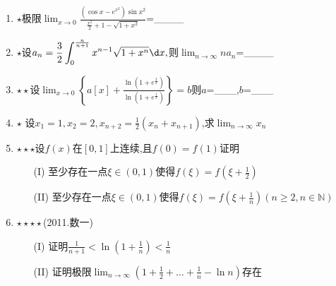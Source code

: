 \documentclass[12pt, a4paper, oneside, UTF8]{ctexbook}
\begin{document}
\begin{enumerate}
    \item $\star$极限$\displaystyle \lim_{x\to 0}\frac{(\cos{x}-e^{x^2})\sin x^2}{\frac{x^2}{2}+1-\sqrt{1+x^2}}$=\_\_\_\_ 
    
    \item $\star$设$\displaystyle a_n=\frac{3}{2}\int_{0}^{\frac{n}{n+1}}x^{n-1}\sqrt{1+x^n}\d x,$则$\displaystyle \lim_{n\to\infty}na_n$=\_\_\_\_
    
    \item $\star\star$设$\displaystyle \lim_{x\to 0}\left\{a\left[x\right]+\frac{\ln\left(1+e^{\frac{2}{x}}\right)}{\ln\left(1+e^{\frac{1}{x}}\right)}\right\}=b$则$a$=\_\_\_,$b$=\_\_\_

    \item $\star$ 设$x_1=1,x_2=2,x_{n+2}=\displaystyle \frac{1}{2}(x_n+x_{n+1})$,求$\displaystyle\lim_{n\to\infty}x_n$ 

    \item $\star\star\star$设$f(x)$在$\left[0,1\right]$上连续,且$f(0)=f(1)$证明 
    \begin{enumerate}
        \item [(I)] 至少存在一点$\xi\in\left(0,1\right)$使得$f(\xi)=f(\xi+\displaystyle \frac{1}{2})$ 
        \item [(II)] 至少存在一点$\xi\in\left(0,1\right)$使得$f(\xi)=f(\xi+\displaystyle \frac{1}{n})(n\geq 2, n\in\mathbb{N})$
    \end{enumerate}

    \item $\star\star\star\star$(2011.数一) 
    \begin{enumerate}
        \item[(I)] 证明$\displaystyle \frac{1}{n+1}<\ln{(1+\frac{1}{n})}<\frac{1}{n}$
        \item[(II)] 证明极限$\displaystyle \lim_{n\to\infty}\left(1+\frac{1}{2}+\ldots+\frac{1}{n}-\ln{n}\right)$存在
    \end{enumerate}
\end{enumerate}
\end{document}
